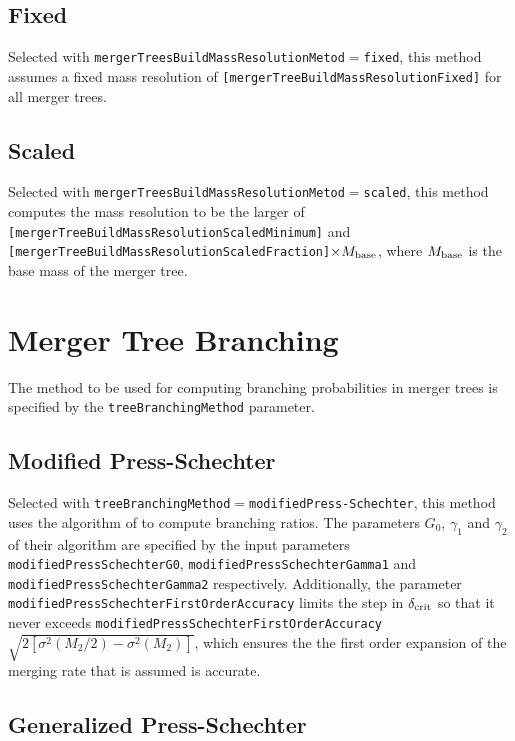 \subsection{Fixed}

Selected with {\tt mergerTreesBuildMassResolutionMetod}$=${\tt fixed}, this method assumes a fixed mass resolution of {\tt [mergerTreeBuildMassResolutionFixed]} for all merger trees.

\subsection{Scaled}

Selected with {\tt mergerTreesBuildMassResolutionMetod}$=${\tt scaled}, this method computes the mass resolution to be the larger of {\tt [mergerTreeBuildMassResolutionScaledMinimum]} and {\tt [mergerTreeBuildMassResolutionScaledFraction]}$\times M_{\rm base}$, where $M_{\rm base}$ is the base mass of the merger tree.

\section{Merger Tree Branching}

The method to be used for computing branching probabilities in merger trees is specified by the {\tt treeBranchingMethod} parameter.

\subsection{Modified Press-Schechter}

Selected with {\tt treeBranchingMethod}$=${\tt modifiedPress-Schechter}, this method uses the algorithm of \cite{parkinson_generating_2008} to compute branching ratios. The parameters $G_0$, $\gamma_1$ and $\gamma_2$ of their algorithm are specified by the input parameters {\tt modifiedPressSchechterG0}, {\tt modifiedPressSchechterGamma1} and {\tt modifiedPressSchechterGamma2} respectively. Additionally, the parameter {\tt modifiedPressSchechterFirstOrderAccuracy} limits the step in $\delta_{\rm crit}$ so that it never exceeds {\tt modifiedPressSchechterFirstOrderAccuracy}$\sqrt{2[\sigma^2(M_2/2)-\sigma^2(M_2)]}$, which ensures the the first order expansion of the merging rate that is assumed is accurate.

\subsection{Generalized Press-Schechter}

